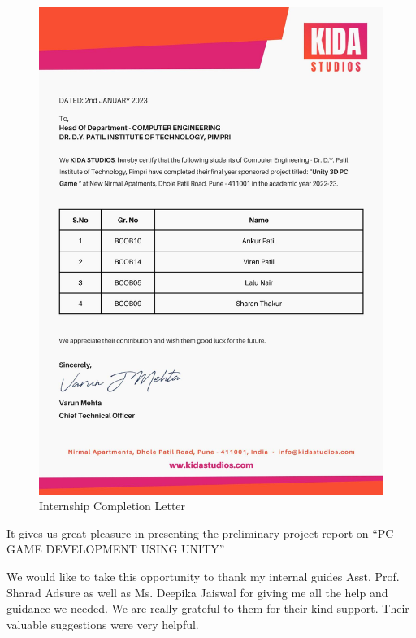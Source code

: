 \documentclass[12pt]{report}
\begin{document}
\begin{figure}[h]
\centering
\includegraphics[scale=0.25]{image3.png}
\caption{Internship Completion Letter}
\label{Sponsorship Letter}
\end{figure}
\thispagestyle{empty}
\clearpage


\vspace{4 cm}
\vspace{1 cm}
\justifying
\vspace{1 cm}
\justifying
\setlength{\parindent}{4em}
\setlength{\parskip}{1em}
\renewcommand{\baselinestretch}{1.5}
\normalsize
It gives us great pleasure in presenting the preliminary project report on “PC GAME DEVELOPMENT USING UNITY”


We would like to take this opportunity to thank my internal guides Asst. Prof. Sharad Adsure as well as Ms. Deepika Jaiswal for giving me all the help and guidance we needed. We are really grateful to them for their kind support. Their valuable suggestions were very helpful. 
\end{document}
